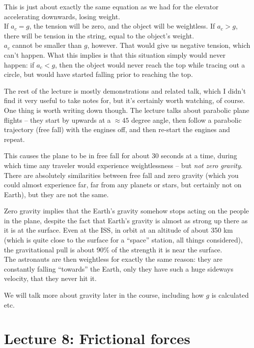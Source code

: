 This is just about exactly the same equation as we had for the elevator accelerating downwards, losing weight.\\
If $a_c = g$, the tension will be zero, and the object will be weightless. If $a_c > g$, there will be tension in the string, equal to the object's weight.\\
$a_c$ cannot be smaller than $g$, however. That would give us negative tension, which can't happen. What this implies is that this situation simply would never happen: if $a_c < g$, then the object would never reach the top while tracing out a circle, but would have started falling prior to reaching the top.

The rest of the lecture is mostly demonstrations and related talk, which I didn't find it very useful to take notes for, but it's certainly worth watching, of course.\\
One thing is worth writing down though. The lecture talks about parabolic plane flights -- they start by upwards at a $\approx 45$ degree angle, then follow a parabolic trajectory (free fall) with the engines off, and then re-start the engines and repeat.

This causes the plane to be in free fall for about 30 seconds at a time, during which time any traveler would experience weightlessness -- but \emph{not zero gravity}. There are absolutely similarities between free fall and zero gravity (which you could almost experience far, far from any planets or stars, but certainly not on Earth), but they are not the same.

Zero gravity implies that the Earth's gravity somehow stops acting on the people in the plane, despite the fact that Earth's gravity is almost as strong up there as it is at the surface. Even at the ISS, in orbit at an altitude of about 350 km (which is quite close to the surface for a ``space'' station, all things considered), the gravitational pull is about 90\% of the strength it is near the surface.\\
The astronauts are then weightless for exactly the same reason: they are constantly falling ``towards'' the Earth, only they have such a huge sideways velocity, that they never hit it.

We will talk more about gravity later in the course, including how $g$ is calculated etc.

\section{Lecture 8: Frictional forces}

